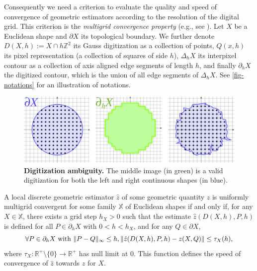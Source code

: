 \documentclass[review]{siamart220329}
\DeclarePairedDelimiter\norm{\lVert}{\rVert}%
\begin{document}
Consequently we need a criterion to evaluate the quality and speed
of convergence of geometric estimators according to the resolution of
the digital grid. This criterion is the \emph{multigrid convergence
property} (e.g., see \cite{klette2004digital}). Let $X$ be a Euclidean
shape and $\partial X$ its topological boundary. We further denote $D(X,h):=X \cap h\mathbb{Z}^2$ its Gauss digitization as a collection  of points, $Q(x,h)$ its pixel representation (a collection  of squares of side $h$), $\Delta_h X$ its interpixel contour as a collection  of axis aligned edge segments of length $h$, and finally $\partial_hX$ the digitized contour, which is the union of all edge segments of $\Delta_h X$. See \cref{fig-notations} for an illustration of notations.
%
%
\begin{figure}
\center
\includegraphics[scale=1]{figures/ambiguity-and-boundaries.png}
\caption{\textbf{Digitization ambiguity.} The middle image (in green) is a valid digitization for both the left and right continuous shapes (in blue).}
\label{fig:digitization-ambiguity}
\end{figure}
%
%
\begin{definition}
  A local discrete geometric estimator $\hat{z}$ of some geometric
  quantity $z$ is uniformly multigrid convergent for some family $\mathbb{X}$ of Euclidean shapes if
  and only if, for any $X \in \mathbb{X}$, there exists a grid step
  $h_X>0$ such that the estimate $\hat{z}(D(X,h), P,h)$ is
  defined for all $P \in \partial_hX$ with $ 0 < h < h_X$, and
  for any $Q \in \partial X$,
  \begin{equation*}
    \forall P \in  \partial_hX \text{ with } \norm{ P - Q }_{\infty} \leq h, \norm{ \hat{z}(D(X,h),P,h) - z(X,Q)} \leq \tau_{X}(h),			
  \end{equation*}
  where $\tau_{X}:\mathbb{R}^{+}\setminus\{0\} \rightarrow
  \mathbb{R}^{+}$ has null limit at $0$. This function defines the
  speed of convergence of $\hat{z}$ towards $z$ for $X$.
\end{definition}
	
\end{document}

